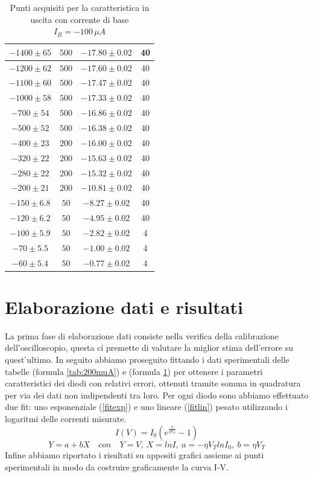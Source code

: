 \documentclass[]{article}
\begin{document}
\begin{table}[H]
\begin{tabular}{|c|c|c|c|}
		\hline
		$ -1400\pm 65 $ &$ 500 $ & $ -17.80\pm 0.02 $ &40 \\
		\hline
		$ -1200\pm 62 $ &$ 500 $ & $ -17.60\pm 0.02 $ &40 \\
		\hline
		$ -1100\pm 60 $ &$ 500 $ & $ -17.47\pm 0.02 $ &40 \\
		\hline
		$ -1000\pm 58 $ &$ 500 $ & $ -17.33\pm 0.02 $ &40 \\
		\hline
		$ -700\pm 54 $ &$ 500 $ & $ -16.86\pm 0.02 $ &40 \\
		\hline
		$ -500\pm 52 $ &$ 500 $ & $ -16.38\pm 0.02 $ &40 \\
		\hline
		$ -400\pm 23 $ &$ 200 $ & $ -16.00\pm 0.02 $ &40 \\
		\hline
		$ -320\pm 22 $ &$ 200 $ & $-15.63\pm 0.02 $ &40 \\
		\hline
		$-280\pm 22 $ &$ 200 $ & $ -15.32\pm 0.02 $ &40 \\
		\hline
		$ -200\pm 21 $ &$ 200 $ & $ -10.81\pm 0.02 $ &40 \\
		\hline
		$ -150\pm 6.8 $ &$ 50 $ & $ -8.27\pm 0.02 $ &40 \\
		\hline
		$ -120\pm 6.2 $ &$ 50 $ & $ -4.95\pm 0.02 $ &40 \\
		\hline
		$ -100\pm 5.9 $ &$ 50 $ & $ -2.82\pm 0.02 $ &4 \\
		\hline
		$ -70\pm 5.5 $ &$ 50 $ & $ -1.00\pm 0.02 $ &4 \\
		\hline
		$ -60\pm 5.4 $ &$ 50 $ & $ -0.77\pm 0.02 $ &4 \\
		\hline
	\end{tabular}
\caption{Punti acquisiti per la caratteristica in uscita con corrente di base $ I_{B}= -100\, \mu A $}
\label{tab:100muA}
\end{table}
\section{Elaborazione dati e risultati}

La prima fase di elaborazione dati consiste nella verifica della calibrazione dell'oscilloscopio, questa ci premette di valutare la miglior stima dell'errore su quest'ultimo. In seguito abbiamo proseguito fittando i dati sperimentali delle tabelle (formula \ref{tab:200muA}) e (formula \ref{tab:100muA}) per ottenere i parametri caratteristici dei diodi con relativi errori, ottenuti tramite somma in quadratura per via dei dati non indipendenti tra loro. Per ogni diodo sono abbiamo effettuato due fit: uno esponenziale (\ref{fitexp}) e uno lineare (\ref{fitlin}) pesato utilizzando i logaritmi delle correnti misurate.
\begin{equation}
	I(V)=I_0(e^{\frac{V}{\eta V_T}}-1)
	\label{fitexp}
\end{equation}
\begin{equation}
	Y=a+bX \quad con\quad Y=V,\: X=lnI, \:a=-\eta V_{T}lnI_{0},\: b=\eta V_{T}%
	\label{fitlin}
\end{equation}
Infine abbiamo riportato i risultati su appositi grafici assieme ai punti sperimentali in modo da costruire graficamente la curva I-V. 
\end{document}
